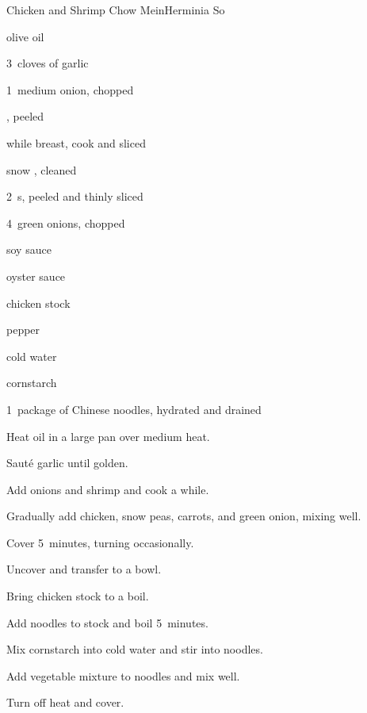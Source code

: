 \begin{recipe}{Chicken and Shrimp Chow Mein}{Herminia So}{}

\begin{ingredients}
\item \C{\quarter} olive oil
\item 3~cloves of garlic
\item 1~medium onion, chopped
\item {} , peeled
\item while  breast, cook and sliced
\item {} snow , cleaned
\item 2~s, peeled and thinly sliced
\item 4~green onions, chopped
\item {} soy sauce
\item {} oyster sauce
\item {} chicken stock
\item \tp{\half} pepper
\item \Tp{1\half} cold water
\item {} cornstarch
\item 1~package of Chinese noodles, hydrated and drained
\end{ingredients}

\begin{directions}
\item Heat oil in a large pan over medium heat.
\item Saut\'e garlic until golden.
\item Add onions and shrimp and cook a while.
\item Gradually add chicken, snow peas, carrots, and green onion, mixing well.
\item Cover 5~minutes, turning occasionally.
\item Uncover and transfer to a bowl.
\item Bring chicken stock to a boil.
\item Add noodles to stock and boil 5~minutes.
\item Mix cornstarch into cold water and stir into noodles.
\item Add vegetable mixture to noodles and mix well.
\item Turn off heat and cover.
\end{directions}

\end{recipe}
